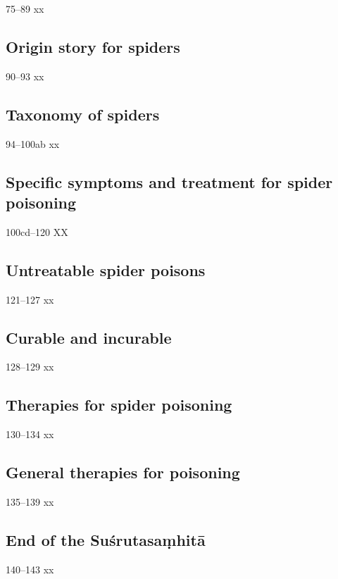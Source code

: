 \begin{translation}
 \item[75--89] xx
 
 \subsection{Origin story for spiders}
 
 \item[90--93] xx
 
 \subsection{Taxonomy of spiders}
 
 \item[94--100ab] xx
 
 \subsection{Specific symptoms and treatment for spider poisoning}
 
 \item[100cd--120] XX
 
 \subsection{Untreatable spider poisons}
 
 \item [121--127] xx
 
 \subsection{Curable and incurable}
 
 \item[128--129] xx
 
 \subsection{Therapies for spider poisoning}
 
 \item [130--134] xx
 
\subsection{General therapies for poisoning}

\item [135--139] xx

\subsection{End of the Suśrutasaṃhitā}

\item[140--143] xx
 
\end{translation}